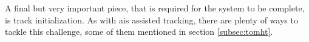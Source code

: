 
A final but very important piece, that is required for the system to be complete, is track initialization. As with \gls{ais} assisted \gls{tracking}, there are plenty of ways to tackle this challenge, some of them mentioned in section \ref{subsec:tomht}. %